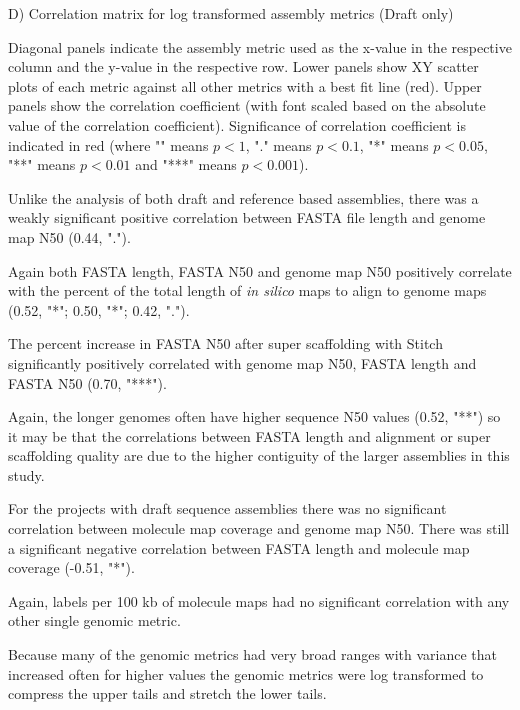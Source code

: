 D) Correlation matrix for log transformed assembly metrics (Draft only)

Diagonal panels indicate the assembly metric used as the x-value in the respective column and the y-value in the respective row. Lower panels show XY scatter plots of each metric against all other metrics with a best fit line (red). Upper panels show the correlation coefficient (with font scaled based on the absolute value of the correlation coefficient). Significance of correlation coefficient is indicated in red (where "" means $p< 1$, "." means $p< 0.1$, "*" means $p< 0.05$, "**" means $p< 0.01$ and "***" means $p< 0.001$).

Unlike the analysis of both draft and reference based assemblies, there was a weakly significant positive correlation between FASTA file length and genome map N50 (0.44, "."). 

Again both FASTA length, FASTA N50 and genome map N50 positively correlate with the percent of the total length of \textit{in silico} maps to align to genome maps (0.52, "*"; 0.50, "*"; 0.42, "."). 

The percent increase in FASTA N50 after super scaffolding with Stitch significantly positively correlated with genome map N50, FASTA length and FASTA N50 (0.70, "***").

Again, the longer genomes often have higher sequence N50 values (0.52, "**") so it may be that the correlations between FASTA length and alignment or super scaffolding quality are due to the higher contiguity of the larger assemblies in this study.

For the projects with draft sequence assemblies there was no significant correlation between molecule map coverage and genome map N50. There was still a significant negative correlation between FASTA length and molecule map coverage (-0.51, "*").

Again, labels per 100 kb of molecule maps had no significant correlation with any other single genomic metric.

Because many of the genomic metrics had very broad ranges with variance that increased often for higher values the genomic metrics were log transformed to compress the upper tails and stretch the lower tails.
